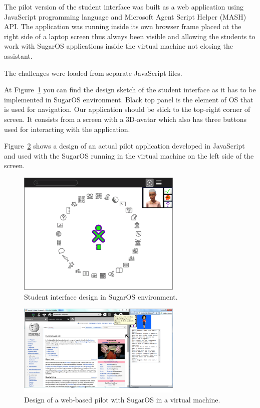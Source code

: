 \documentclass[a4paper]{article}
\begin{document}
The pilot version of the student interface was built as a web application using JavaScript programming language and Microsoft Agent Script Helper (MASH) API. The application was running inside its own browser frame placed at the right side of a laptop screen thus always been visible and allowing the students to work with SugarOS applications inside the virtual machine not closing the assistant.

The challenges were loaded from separate JavaScript files.

At Figure~\ref{fig:intended-design} you can find the design sketch of the student interface as it has to be implemented in SugarOS environment. Black top panel is the element of OS that is used for navigation. Our application should be stick to the top-right corner of screen. It consists from a screen with a 3D-avatar which also has three buttons used for interacting with the application. 

Figure~\ref{fig:pilot-design} shows a design of an actual pilot application developed in JavaScript and used with the SugarOS running in the virtual machine on the left side of the screen. 

\begin{figure}[ht]
\begin{center}
\includegraphics[width=0.7\textwidth]{intended-design.png}
\caption{Student interface design in SugarOS environment.}
\label{fig:intended-design}
\end{center}
\end{figure}

\begin{figure}[ht]
\begin{center}
\includegraphics[width=0.7\textwidth]{pilot-design.png}
\caption{Design of a web-based pilot with SugarOS in a virtual machine.}
\label{fig:pilot-design}
\end{center}
\end{figure}
\end{document}

